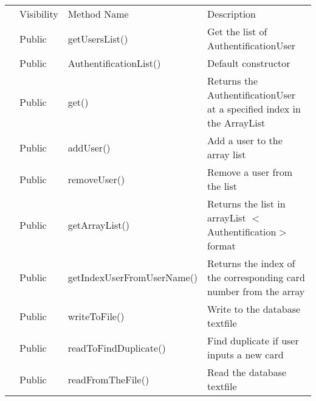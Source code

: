 \documentclass{article}
\begin{document}
\begin{table}[]
{\begin{tabular}{|p{2cm}||p{1.5cm}||p{5cm}||p{4cm}||p{3cm}|}
\rowcolor[HTML]{C0C0C0} 
\cellcolor[HTML]{C0C0C0}{\color[HTML]{000000} }                             & Visibility & Method Name & \multicolumn{2}{l|}{\cellcolor[HTML]{C0C0C0}Description} \\ \cline{2-5} 
\multirow{-2}{*}{\cellcolor[HTML]{C0C0C0}{\color[HTML]{000000} Methods}}    &  Public      &  getUsersList()       & \multicolumn{2}{l|}{Get the list of AuthentificationUser }                               \\ \cline{2-5}
\multirow{-2}{*}{\cellcolor[HTML]{C0C0C0}{\color[HTML]{000000} }}    &  Public      &  AuthentificationList()       & \multicolumn{2}{l|}{Default constructor }                               \\ \cline{2-5}
\multirow{-2}{*}{\cellcolor[HTML]{C0C0C0}{\color[HTML]{000000} }}    &  Public      &  get()       & \multicolumn{2}{l|}{Returns the AuthentificationUser at a specified index in the ArrayList}                               \\ \cline{2-5}
\multirow{-2}{*}{\cellcolor[HTML]{C0C0C0}{\color[HTML]{000000} }}    &  Public      & addUser()       & \multicolumn{2}{l|}{Add a user to the array list }                               \\ \cline{2-5}
\multirow{-2}{*}{\cellcolor[HTML]{C0C0C0}{\color[HTML]{000000} }}    &  Public      &  removeUser()      & \multicolumn{2}{l|}{Remove a user from the list }                               \\ \cline{2-5}
\multirow{-2}{*}{\cellcolor[HTML]{C0C0C0}{\color[HTML]{000000} }}    &  Public      &  getArrayList()      & \multicolumn{2}{l|}{Returns the list in arrayList $<$Authentification$>$ format }                               \\ \cline{2-5}
\multirow{-2}{*}{\cellcolor[HTML]{C0C0C0}{\color[HTML]{000000} }}    &  Public      &  getIndexUserFromUserName()      & \multicolumn{2}{l|}{Returns the index of the corresponding card number from the array }                               \\ \cline{2-5}
\multirow{-2}{*}{\cellcolor[HTML]{C0C0C0}{\color[HTML]{000000} }}    &  Public      &  writeToFile()       & \multicolumn{2}{l|}{Write to the database textfile }                               \\ \cline{2-5}
\multirow{-2}{*}{\cellcolor[HTML]{C0C0C0}{\color[HTML]{000000} }}    &  Public      &  readToFindDuplicate()       & \multicolumn{2}{l|}{Find duplicate if user inputs a new card }                               \\ \cline{2-5}
\multirow{-2}{*}{\cellcolor[HTML]{C0C0C0}{\color[HTML]{000000} }}    &  Public      &  readFromTheFile()      & \multicolumn{2}{l|}{Read the database textfile }                               \\ \cline{2-5}

\end{tabular}
}
\end{table}
\end{document}
